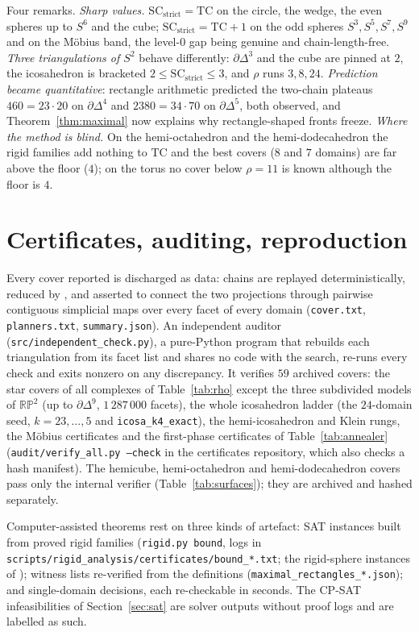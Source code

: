 \documentclass[12pt]{article}
\newcommand{\TC}{\mathrm{TC}}
\newcommand{\SC}{\mathrm{SC}}
\newcommand{\SCst}{\SC_{\mathrm{strict}}}
\begin{document}
Four remarks.  \emph{Sharp values.}  $\SCst=\TC$ on the circle, the
wedge, the even spheres up to $S^6$ and the cube; $\SCst=\TC+1$ on the
odd spheres $S^3,S^5,S^7,S^9$ and on the M\"obius band, the level-$0$ gap
being genuine and chain-length-free.  \emph{Three triangulations of
$S^2$} behave differently: $\partial\Delta^3$ and the cube are pinned at
$2$, the icosahedron is bracketed $2\le\SCst\le3$, and $\rho$ runs
$3,8,24$.  \emph{Prediction became quantitative}: rectangle arithmetic
predicted the two-chain plateaus $460=23\cdot20$ on $\partial\Delta^4$ and
$2380=34\cdot70$ on $\partial\Delta^5$, both observed, and
Theorem~\ref{thm:maximal} now explains why rectangle-shaped fronts freeze.
\emph{Where the method is blind.}  On the hemi-octahedron and the
hemi-dodecahedron the rigid families add nothing to $\TC$ and the best
covers ($8$ and $7$ domains) are far above the floor ($4$); on the torus
no cover below $\rho=11$ is known although the floor is $4$.

\section{Certificates, auditing, reproduction}\label{sec:repro}

Every cover reported is discharged as data: chains are replayed
deterministically, reduced by \cite[Alg.~2]{OLGB21}, and asserted to connect
the two projections through pairwise contiguous simplicial maps over every
facet of every domain (\texttt{cover.txt}, \texttt{planners.txt},
\texttt{summary.json}).  An independent auditor
(\texttt{src/independent\_check.py}), a pure-Python program that rebuilds
each triangulation from its facet list and shares no code with the search,
re-runs every check and exits nonzero on any discrepancy.  It verifies
$59$ archived covers: the star covers of all complexes of
Table~\ref{tab:rho} except the three subdivided models of $\mathbb{RP}^2$
(up to $\partial\Delta^9$, $1\,287\,000$ facets), the whole icosahedron
ladder (the $24$-domain seed, $k=23,\dots,5$ and \texttt{icosa\_k4\_exact}),
the hemi-icosahedron and Klein rungs, the M\"obius certificates and the
first-phase certificates of Table~\ref{tab:annealer}
(\texttt{audit/verify\_all.py --check} in the certificates repository, which
also checks a hash manifest).  The hemicube, hemi-octahedron and
hemi-dodecahedron covers pass only the internal verifier
(Table~\ref{tab:surfaces}); they are archived and hashed separately.

Computer-assisted theorems rest on three kinds of artefact: SAT instances
built from proved rigid families (\texttt{rigid.py bound}, logs in \texttt{scripts/rigid\_analysis/}\allowbreak\texttt{certificates/}\allowbreak\texttt{bound\_*.txt}; the rigid-sphere instances of \cite{PM26b}); witness lists re-verified from the definitions
(\texttt{maximal\_rectangles\_*.json}); and single-domain decisions, each
re-checkable in seconds.  The CP-SAT infeasibilities of Section~\ref{sec:sat}
are solver outputs without proof logs and are labelled as such.
\end{document}
